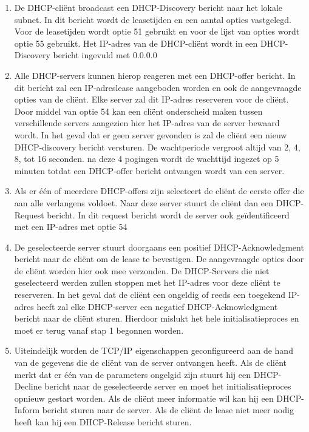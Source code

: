 \documentclass{report}
\begin{document}
\begin{enumerate}
{	\begin{enumerate}
		\item De DHCP-cliënt broadcast een DHCP-Discovery bericht naar het lokale subnet. In dit bericht wordt de leasetijden en een aantal opties vastgelegd. Voor de leasetijden wordt optie 51 gebruikt en voor de lijst van opties wordt optie 55 gebruikt. Het IP-adres van de DHCP-cliënt wordt in een DHCP-Discovery bericht ingevuld met 0.0.0.0
		\item Alle DHCP-servers kunnen hierop reageren met een DHCP-offer bericht. In dit bericht zal een IP-adreslease aangeboden worden en ook de aangevraagde opties van de cliënt. Elke server zal dit IP-adres reserveren voor de cliënt. Door middel van optie 54 kan een cliënt onderscheid maken tussen verschillende servers aangezien hier het IP-adres van de server bewaard wordt. In het geval dat er geen server gevonden is zal de cliënt een nieuw DHCP-discovery bericht versturen. De wachtperiode vergroot altijd van 2, 4, 8, tot 16 seconden. na deze 4 pogingen wordt de wachttijd ingezet op 5 minuten totdat een DHCP-offer bericht ontvangen wordt van een server.
		\item Als er één of meerdere DHCP-offers zijn selecteert de cliënt de eerste offer die aan alle verlangens voldoet. Naar deze server stuurt de cliënt dan een DHCP-Request bericht. In dit request bericht wordt de server ook geïdentificeerd met een IP-adres met optie 54
		\item De geselecteerde server stuurt doorgaans een positief DHCP-Acknowledgment bericht naar de cliënt om de lease te bevestigen. De aangevraagde opties door de cliënt worden hier ook mee verzonden. De DHCP-Servers die niet geselecteerd werden zullen stoppen met het IP-adres voor deze cliënt te reserveren. In het geval dat de cliënt een ongeldig of reeds een toegekend IP-adres heeft zal elke DHCP-server een negatief DHCP-Acknowledgment bericht naar de cliënt sturen. Hierdoor mislukt het hele initialisatieproces en moet er terug vanaf stap 1 begonnen worden.
		\item Uiteindelijk worden de TCP/IP eigenschappen geconfigureerd aan de hand van de gegevens die de cliënt van de server ontvangen heeft. Als de cliënt merkt dat er één van de parameters ongelgid zijn stuurt hij een DHCP-Decline bericht naar de geselecteerde server en moet het initialisatieproces opnieuw gestart worden. Als de cliënt meer informatie wil kan hij een DHCP-Inform bericht sturen naar de server. Als de cliënt de lease niet meer nodig heeft kan hij een DHCP-Release bericht sturen.
		

\end{enumerate}}
\end{enumerate}
\end{document}
